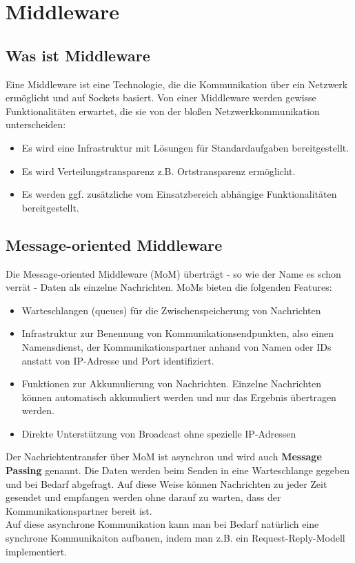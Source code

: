 \section{Middleware}

\subsection{Was ist Middleware}

Eine Middleware ist eine Technologie, die die Kommunikation über ein Netzwerk ermöglicht und auf Sockets basiert. Von einer Middleware werden gewisse Funktionalitäten erwartet, die sie von der bloßen Netzwerkkommunikation unterscheiden:

\begin{itemize}
    \item Es wird eine Infrastruktur mit Lösungen für Standardaufgaben bereitgestellt.
    \item Es wird Verteilungstransparenz z.B. Ortstransparenz ermöglicht.
    \item Es werden ggf. zusätzliche vom Einsatzbereich abhängige Funktionalitäten bereitgestellt.
\end{itemize}


\subsection{Message-oriented Middleware}

Die Message-oriented Middleware (MoM) überträgt - so wie der Name es schon verrät - Daten als einzelne Nachrichten. MoMs bieten die folgenden Features:

\begin{itemize}
    \item Warteschlangen (queues) für die Zwischenspeicherung von Nachrichten
    \item Infrastruktur zur Benennung von Kommunikationsendpunkten, also einen Namensdienst, der Kommunikationspartner anhand von Namen oder IDs anstatt von IP-Adresse und Port identifiziert.
    \item Funktionen zur Akkumulierung von Nachrichten. Einzelne Nachrichten können automatisch akkumuliert werden und nur das Ergebnis übertragen werden.
    \item Direkte Unterstützung von Broadcast ohne spezielle IP-Adressen
\end{itemize}

Der Nachrichtentransfer über MoM ist asynchron und wird auch \textbf{Message Passing} genannt. Die Daten werden beim Senden in eine Warteschlange gegeben und bei Bedarf abgefragt. Auf diese Weise können Nachrichten zu jeder Zeit gesendet und empfangen werden ohne darauf zu warten, dass der Kommunikationspartner bereit ist.\\
Auf diese asynchrone Kommunikation kann man bei Bedarf natürlich eine synchrone Kommunikaiton aufbauen, indem man z.B. ein Request-Reply-Modell implementiert.

